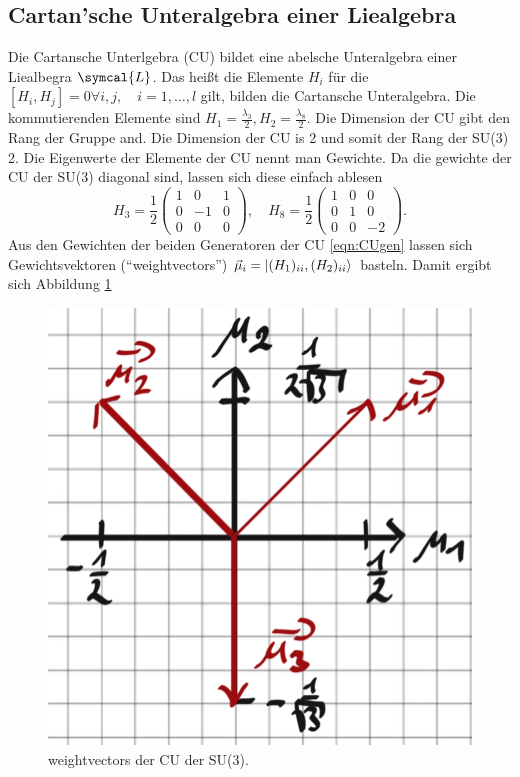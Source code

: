 \documentclass[
  captions=tableheading,  %
  titlepage=firstiscover, %
]{scrartcl}
\DeclarePairedDelimiter{\ket}{\lvert}{\rangle}
\begin{document}
\subsection{Cartan'sche Unteralgebra einer Liealgebra}
Die Cartansche Unterlgebra (CU) bildet eine abelsche Unteralgebra einer Liealbegra $\symcal{L}$.
Das heißt die Elemente $H_i$ für die $[H_i, H_j] = 0 \forall i,j, \quad i = 1, \ldots, l$ gilt, bilden 
die Cartansche Unteralgebra.
Die kommutierenden Elemente sind $H_1 = \frac{\lambda_3}{2}, H_2 = \frac{\lambda_8}{2}$.
Die Dimension der CU gibt den Rang der Gruppe and.
Die Dimension der CU is 2 und somit der Rang der SU(3) 2.
Die Eigenwerte der Elemente der CU nennt man Gewichte.
Da die gewichte der CU der SU(3) diagonal sind, lassen sich diese einfach ablesen
\begin{equation*}
  H_3 = \frac{1}{2}
  \begin{pmatrix}
    1 &  0  & 1 \\
    0 & -1  & 0 \\ 
    0 & 0   & 0 
  \end{pmatrix} ,\quad 
  H_8 = \frac{1}{2}
  \begin{pmatrix}
    1 & 0 & 0 \\
    0 & 1 & 0 \\
    0 & 0 & -2
  \end{pmatrix}. \label{eqn:CUgen}
\end{equation*}
Aus den Gewichten der beiden Generatoren der CU \eqref{eqn:CUgen} lassen sich 
Gewichtsvektoren (\enquote{weightvectors}) $\vec{\mu}_i = \ket{(H_1)_{ii}, (H_2)_{ii}}$ basteln.
Damit ergibt sich Abbildung \ref{fig:weightvectors}
\begin{figure}
  \centering
  \includegraphics[width = 0.35 \textwidth]{CU_mu.jpg}
  \caption{weightvectors der CU der SU(3).}
  \label{fig:weightvectors}
\end{figure}
\end{document}

